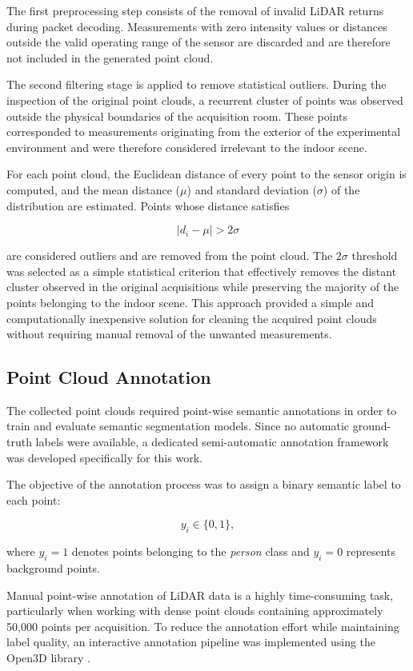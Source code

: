 The first preprocessing step consists of the removal of invalid LiDAR returns during packet decoding. Measurements with zero intensity values or distances outside the valid operating range of the sensor are discarded and are therefore not included in the generated point cloud.

The second filtering stage is applied to remove statistical outliers. During the inspection of the original point clouds, a recurrent cluster of points was observed outside the physical boundaries of the acquisition room. These points corresponded to measurements originating from the exterior of the experimental environment and were therefore considered irrelevant to the indoor scene.

For each point cloud, the Euclidean distance of every point to the sensor origin is computed, and the mean distance ($\mu$) and standard deviation ($\sigma$) of the distribution are estimated. Points whose distance satisfies

\[
|d_i-\mu| > 2\sigma
\]

are considered outliers and are removed from the point cloud. The $2\sigma$ threshold was selected as a simple statistical criterion that effectively removes the distant cluster observed in the original acquisitions while preserving the majority of the points belonging to the indoor scene. This approach provided a simple and computationally inexpensive solution for cleaning the acquired point clouds without requiring manual removal of the unwanted measurements.



\subsection{Point Cloud Annotation}
\label{subsec:annotation}

The collected point clouds required point-wise semantic annotations in order to train and evaluate semantic segmentation models. Since no automatic ground-truth labels were available, a dedicated semi-automatic annotation framework was developed specifically for this work.

The objective of the annotation process was to assign a binary semantic label to each point:

\[
y_i \in \{0,1\},
\]

where \(y_i=1\) denotes points belonging to the \textit{person} class and \(y_i=0\) represents background points.

Manual point-wise annotation of LiDAR data is a highly time-consuming task, particularly when working with dense point clouds containing approximately 50,000 points per acquisition. To reduce the annotation effort while maintaining label quality, an interactive annotation pipeline was implemented using the Open3D library \cite{Zhou2018Open3D}.

